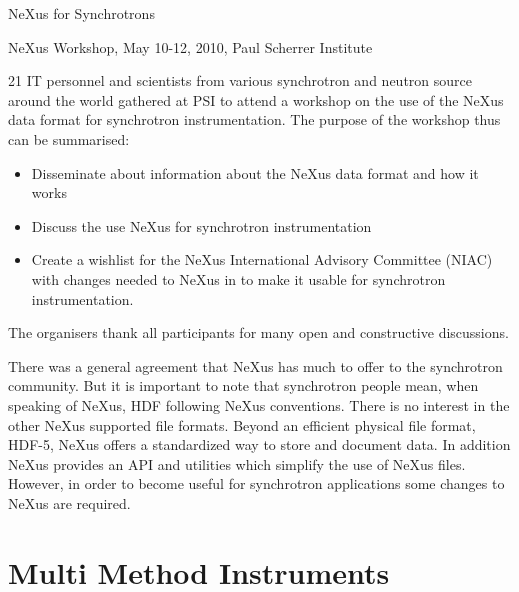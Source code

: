 \documentclass[a4paper]{article}\usepackage[dvips]{graphicx}
\begin{document}
\centerline{{\huge NeXus for Synchrotrons }}
\vspace{1cm}

\centerline{NeXus Workshop, May 10-12, 2010, Paul Scherrer Institute }
\vspace{1.5cm}



21 IT personnel and scientists from various synchrotron and neutron source around the 
world gathered at PSI to attend a workshop on the use of the NeXus data format for 
synchrotron instrumentation. The purpose of the workshop thus can be summarised:


\begin{itemize}\item Disseminate about information about the NeXus data format and how it works
\item Discuss the use  NeXus for synchrotron instrumentation
\item Create a wishlist for the NeXus International Advisory Committee (NIAC) with 
  changes needed to NeXus in to make it usable for synchrotron instrumentation.
\end{itemize}The organisers thank all participants for many open and constructive 
discussions. 
\vspace{1cm}


\vspace{.5cm}
There was a general agreement that NeXus has much to offer to the synchrotron 
community. But it is important to note that synchrotron people mean, when 
speaking of NeXus, HDF following NeXus conventions. There is no interest in the other 
NeXus supported file formats.  Beyond an efficient physical file format, HDF-5, NeXus offers a 
standardized way to store and document data. In addition NeXus provides 
an API and utilities which simplify the use of NeXus files. However, in order 
to become useful for synchrotron applications some changes to NeXus are required.



\section{Multi Method Instruments }
\end{document}
